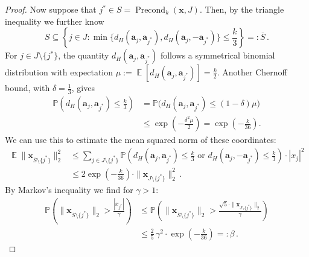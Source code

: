 \documentclass[12pt]{article}
\theoremstyle{plain}
\theoremstyle{definition}
\renewcommand{\P}{{\mathbb P}}
\newcommand{\expect}{\operatorname{\mathbb{E}}}
\renewcommand{\vec}{\boldsymbol}
\DeclareMathOperator{\precond}{Precond}
\begin{document}
\begin{proof}
    Now suppose that $j^\ast \in S = \precond_k(\vec{x},J)$. Then, by the triangle inequality we further know
    \begin{equation*}
        S \subseteq \left\{ j \in J \colon \min\{d_H(\vec{a}_j,\vec{a}_{j^\ast}),d_H(\vec{a}_j,-\vec{a}_{j^\ast})\}
                \leq \frac{k}{3} \right\} =: \overline{S} \,.
    \end{equation*}
    For $j \in J \setminus\{j^\ast\}$, the quantity $d_H(\vec{a}_j,\vec{a}_{j^\ast})$ follows a symmetrical binomial distribution with expectation $\mu := \expect\left[d_H(\vec{a}_j,\vec{a}_{j^\ast})\right] = \frac{k}{2}$.
    Another Chernoff bound,
    with $\delta = \frac{1}{3}$,
    gives
    \begin{align*}
        \P\left(d_H(\vec{a}_j,\vec{a}_{j^\ast}) \leq \frac{k}{3}\right)
            &= \P\bigl(d_H(\vec{a}_j,\vec{a}_{j^\ast}) \leq (1-\delta) \mu\bigr) \\
            &\leq \exp\left(-\frac{\delta^2 \mu}{2}\right)
            = \exp\left(-\frac{k}{36}\right) .
    \end{align*}
    We can use this to estimate the mean squared norm of these coordinates:
    \begin{align*}
        \expect \|\vec{x}_{\overline{S} \setminus\{j^\ast\}}\|_2^2
            &\leq \sum_{j \in J \setminus\{j^\ast\}} \P\left(d_H(\vec{a}_j,\vec{a}_{j^\ast}) \leq \frac{k}{3} \text{ or } d_H(\vec{a}_j,-\vec{a}_{j^\ast}) \leq \frac{k}{3}\right) \cdot |x_j|^2 \\
            &\leq 2\exp\left(-\frac{k}{36}\right)
                \cdot \|\vec{x}_{J \setminus \{j^\ast\}}\|_2^2 \,.
    \end{align*}
    By Markov's inequality we find for $\gamma > 1$:
    \begin{align}
        \P\left( \|\vec{x}_{\overline{S} \setminus\{j^\ast\}}\|_2 > \frac{|x_{j^\ast}|}{\gamma}\right)
            &\leq \P\left( \|\vec{x}_{\overline{S} \setminus\{j^\ast\}}\|_2 
                    > \frac{\sqrt{5} \cdot \|\vec{x}_{J \setminus\{j^\ast\}}\|_2}{\gamma}\right)
            \nonumber \\
            &\leq \frac{2}{5} \, \gamma^2 \cdot \exp\left(-\frac{k}{36}\right) =: \beta\,.
            \label{eq:precondnorm}
    \end{align}


\end{proof}
\end{document}
